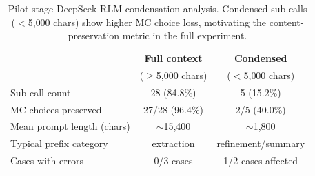 \begin{table}[t]
\centering
\caption{Pilot-stage DeepSeek RLM condensation analysis.  Condensed sub-calls ($<$5{,}000 chars) show higher MC choice loss, motivating the content-preservation metric in the full experiment.}
\label{tab:condensation}
\small
\begin{tabular}{@{}lcc@{}}
\toprule
& \textbf{Full context} & \textbf{Condensed} \\
& ($\geq$5{,}000 chars)      & ($<$5{,}000 chars) \\
\midrule
Sub-call count                  & 28 (84.8\%)         & 5 (15.2\%)          \\
MC choices preserved            & 27/28 (96.4\%)      & 2/5 (40.0\%)        \\
Mean prompt length (chars)      & $\sim$15{,}400      & $\sim$1{,}800       \\
Typical prefix category         & extraction           & refinement/summary  \\
Cases with errors               & 0/3 cases           & 1/2 cases affected  \\
\bottomrule
\end{tabular}
\end{table}
